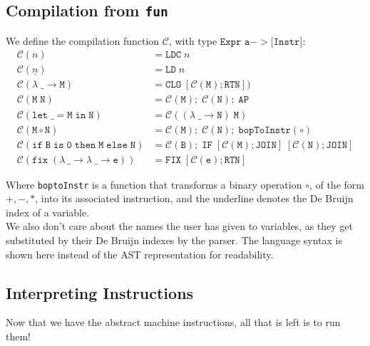 \subsection{Compilation from \texttt{fun}}
We define the compilation function $ \mathcal{C} $, with type $ \texttt{Expr a} -> \texttt{[Instr]} $:
\[
\begin{aligned}
    \mathcal{C}(n) &= \mathtt{LDC}\; n \\
    \mathcal{C}(\underline{n}) &= \mathtt{LD}\; n \\
    \mathcal{C}(\mathtt{\lambda\; \_ \to M}) &= \mathtt{CLO}\; [\mathcal{C}(\mathtt{M}); \mathtt{RTN}]) \\
    \mathcal{C}(\mathtt{M\; N}) &= \mathcal{C}(\mathtt{M});\; \mathcal{C}(\mathtt{N});\; \mathtt{AP} \\
    \mathcal{C}(\mathtt{let\; \_ = M\; in\; N}) & = \mathcal{C}((\lambda\; \_ \to \mathtt{N})\; \mathtt{M}) \\
    \mathcal{C}(\mathtt{M \circ N}) &= \mathcal{C}(\mathtt{M});\; \mathcal{C}(\mathtt{N});\; \mathtt{bopToInstr}(\circ) \\
    \mathcal{C}(\mathtt{if\; B\; is\; 0\; then \; M\; else \; N}) &= \mathcal{C}(\mathtt{B});\; \mathtt{IF}\; [\mathcal{C}(\mathtt{M}); \mathtt{JOIN}]\; [\mathcal{C}(\mathtt{N}); \mathtt{JOIN}] \\
    \mathcal{C}(\mathtt{fix\; (\lambda \ \_ \to \lambda \ \_ \to e)}) &= \mathtt{FIX}\; [\mathcal{C}(\mathtt{e}); \mathtt{RTN}]
\end{aligned}
\]

Where \texttt{boptoInstr} is a function that transforms a binary operation $\circ$, of the form $ +, -, * $, into its associated instruction, and the underline denotes
the De Bruijn index of a variable. \\
We also don't care about the names the user has given to variables, as they get substituted by their De Bruijn indexes by the parser. 
The language syntax is shown here instead of the AST representation for readability.

\subsection{Interpreting Instructions}
Now that we have the abstract machine instructions, all that is left is to run them!

